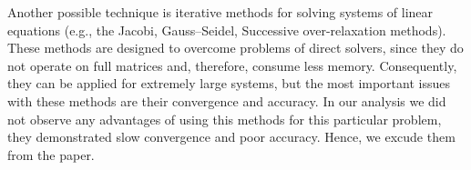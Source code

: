 Another possible technique is iterative methods for solving systems of linear equations (e.g., the Jacobi, Gauss–Seidel, Successive over-relaxation methods). These methods are designed to overcome problems of direct solvers, since they do not operate on full matrices and, therefore, consume less memory. Consequently, they can be applied for extremely large systems, but the most important issues with these methods are their convergence and accuracy. In our analysis we did not observe any advantages of using this methods for this particular problem, they demonstrated slow convergence and poor accuracy. Hence, we excude them from the paper.
